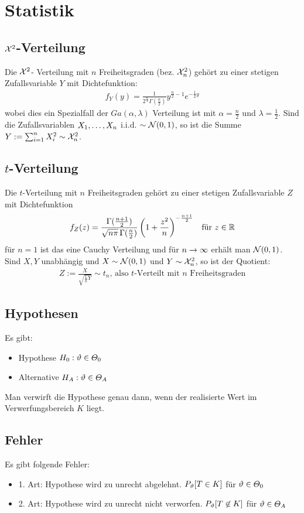 {\section{Statistik}}
\subsection*{$\mathcal{X}^2$-Verteilung}
Die $\mathcal{X}^2$- Verteilung mit $n$ Freiheitsgraden (bez. $\mathcal{X}^2_n$) gehört zu einer
stetigen Zufallsvariable $Y$ mit Dichtefunktion:
\begin{align*}
  f_Y (y) = \frac{1}{2^{\frac{n}{2}}  \Gamma (\frac{n}{2})} y^{\frac{n}{2} - 1} e^{-\frac{1}{2} y}
\end{align*}
wobei dies ein Spezialfall der $Ga (\alpha, \lambda)$ Verteilung ist mit
$\alpha = \frac{n}{2}$ und $\lambda = \frac{1}{2}$. Sind die Zufallsvariablen
$X_1, \dots, X_n$ i.i.d. $\sim \mathcal{N} (0, 1)$, so ist die Summe
$Y := \sum_{i = 1}^n X_i^2 \sim \mathcal{X}^2_n$.
\subsection*{$t$-Verteilung}
Die $t$-Verteilung mit $n$ Freiheitsgraden gehört zu einer stetigen
Zufallsvariable $Z$ mit Dichtefunktion
\begin{align*}
  f_Z (z) = \frac{\Gamma (\frac{n+1}{2})}{\sqrt{n \pi} \, \Gamma (\frac{n}{2})} \left( 1 + \frac{z^2}{n} \right)^{-\frac{n+1}{2}}
   &  & \text{für } z \in \mathbb{R}
\end{align*}
für $n = 1$ ist das eine Cauchy Verteilung und für $n \rightarrow \infty$ erhält man
$\mathcal{N} (0, 1)$. Sind $X, Y$ unabhängig und $X \sim \mathcal{N} (0, 1)$
und $Y \sim \mathcal{X}^2_n$, so ist der Quotient:
\begin{align*}
  Z := \frac{X}{\sqrt{\frac{1}{n} Y}} \sim t_n \text{, also $t$-Verteilt mit $n$ Freiheitsgraden}
\end{align*}
\subsection*{Hypothesen}
Es gibt:
\begin{itemize}
  \item Hypothese $H_0 : \vartheta \in \varTheta_0$
  \item Alternative $H_A : \vartheta \in \varTheta_A$
\end{itemize}
Man verwirft die Hypothese genau dann, wenn der realisierte Wert im
Verwerfungsbereich $K$ liegt.
\subsection*{Fehler}
Es gibt folgende Fehler:
\begin{itemize}
  \item 1. Art: Hypothese wird zu unrecht abgelehnt. $P_\vartheta[T \in K]$ für $\vartheta \in \varTheta_0$
  \item 2. Art: Hypothese wird zu unrecht nicht verworfen. $P_\vartheta[T \not \in K]$ für $\vartheta \in \varTheta_A$
\end{itemize}


